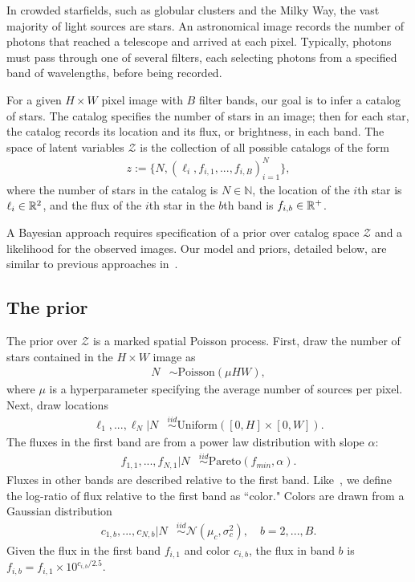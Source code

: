 In crowded starfields, such as globular clusters and the Milky Way, the vast majority of light sources are stars.
An astronomical image records the number of photons that reached a telescope and arrived at each pixel. 
Typically, photons must pass through one of several filters, each selecting photons from a specified band of wavelengths, before being recorded.

For a given $H \times W$ pixel image with $B$ filter bands, our goal is to infer a catalog of 
stars. 
The catalog specifies the number of stars 
in an image; then for each star, the catalog 
records its location and its flux, or brightness,
in each band. 
The space of latent variables 
$\mathcal{Z}$ is the collection of all possible catalogs of the form
\begin{align}
    z := \{N, (\ell_i, f_{i,1}, ..., f_{i,B})_{i = 1}^N\},
    \label{eq:cat_formulation}
\end{align}
where the number of stars in the catalog
is $N\in\mathbb{N}$,
the location of the $i$th star is $\ell_i \in \mathbb{R}^2$, and 
the flux of the $i$th star in the $b$th band is $f_{i, b}\in\mathbb{R}^+$. 

A Bayesian approach requires specification of a prior over catalog space $\mathcal{Z}$ and a likelihood for the observed images. Our model and priors, detailed below, are similar to previous approaches in~\cite{Portillo_2017, Brewer_2013, Feder_2019, regier2019_celeste}.

\subsection{The prior}
The prior over $\mathcal{Z}$ is a marked spatial Poisson process. First, draw the number of stars contained in the $H\times W$ image as
\begin{align}
	N &\sim \text{Poisson}(\mu HW),
	\label{eq:n_prior}
\end{align}
where $\mu$ is a hyperparameter specifying the average number of sources per pixel.
Next, draw locations
\begin{align}
  \ell_1, ..., \ell_N | N &\stackrel{iid}{\sim} \text{Uniform}([0, H] \times [0, W]). 
 \end{align}
The fluxes in the first band are from a power law distribution with slope $\alpha$:
\begin{align}
    f_{1, 1}, ..., f_{N,1} | N & 
    \stackrel{iid}{\sim} \text{Pareto}(f_{min}, \alpha) 
    \label{eq:flux_prior}.
\end{align}
Fluxes in other bands are described relative to the first band. Like~\cite{Feder_2019}, we define the log-ratio of flux relative to the first band as ``color." Colors are drawn from a Gaussian distribution
\begin{align}
  c_{1, b}, ..., c_{N,b} | N  & 
      \stackrel{iid}{\sim} \mathcal{N}(\mu_c, \sigma^2_c), \quad b = 2, ..., B.
\end{align}
Given the flux in the first band $f_{i,1}$ and color $c_{i,b}$,
the flux in band $b$ is  $f_{i,b} = f_{i,1} \times 10^{c_{i,b} / 2.5}$.


